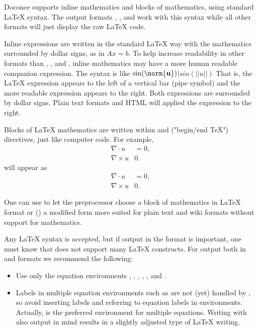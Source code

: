 \documentclass{book}
\begin{document}
{Doconce supports inline mathematics and blocks of mathematics, using
standard {\LaTeX} syntax. The output formats , , and 
work with this syntax while all other formats will just display the
raw {\LaTeX} code.

Inline expressions are written in the standard
{\LaTeX} way with the mathematics surrounded by dollar signs, as in
$Ax=b$. To help increase readability in other formats than ,
, and , inline mathematics may have a more human
readable companion expression. The syntax is like
\bccq
$\sin(\norm{\bf u})$|$sin(||u||)$
\eccq
That is, the {\LaTeX} expression appears to the left of a vertical bar (pipe
symbol) and the more readable expression appears to the right. Both
expressions are surrounded by dollar signs. Plain text formats and HTML
will applied the expression to the right.

Blocks of {\LaTeX} mathematics are written within
and
 ("begin/end TeX") directives, just like computer code.
For example,
\bccq
\begin{align*}
\nabla\cdot u &= 0,\\
\nabla\times u & 0.
\end{align*}
\eccq
will appear as
\begin{align*}
\nabla\cdot u &= 0,\\
\nabla\times u & 0.
\end{align*}

One can use  to let
the preprocessor choose a block of mathematics in {\LaTeX} format
or () a modified form more suited for plain text and wiki
formats without support for mathematics.

Any {\LaTeX} syntax is accepted, but if output in the  format
is important, one must know that  does not support many
{\LaTeX} constructs. For output both in  and  formats we
recommend the following:

\begin{itemize}
  \item Use only the equation environments \code{\[}, \code{\]},
    , , , and .

  \item Labels in multiple equation environments such as  are
    not (yet) handled by , so avoid inserting labels and referring
    to equation labels in  environments. Actually, 
    is the preferred environment for multiple equations. Writing with
    also  output in mind results in a slightly adjusted type
    of {\LaTeX} writing.


\end{itemize}}
\end{document}
